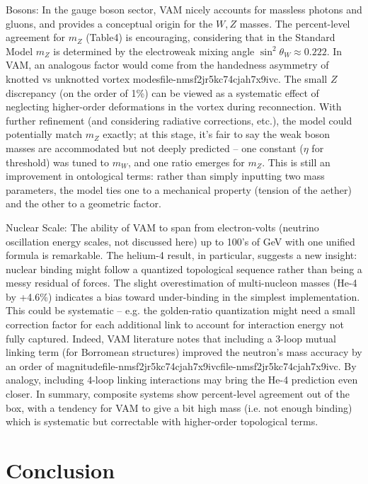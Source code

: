 Bosons: In the gauge boson sector, VAM nicely accounts for massless photons and gluons, and provides a conceptual origin for the $W,Z$ masses. The percent-level agreement for $m_Z$ (Table4) is encouraging, considering that in the Standard Model $m_Z$ is determined by the electroweak mixing angle $\sin^2\theta_W\approx0.222$. In VAM, an analogous factor would come from the handedness asymmetry of knotted vs unknotted vortex modesfile-nmsf2jr5kc74cjah7x9ivc. The small $Z$ discrepancy (on the order of 1\%) can be viewed as a systematic effect of neglecting higher-order deformations in the vortex during reconnection. With further refinement (and considering radiative corrections, etc.), the model could potentially match $m_Z$ exactly; at this stage, it’s fair to say the weak boson masses are accommodated but not deeply predicted – one constant ($\eta$ for threshold) was tuned to $m_W$, and one ratio emerges for $m_Z$. This is still an improvement in ontological terms: rather than simply inputting two mass parameters, the model ties one to a mechanical property (tension of the aether) and the other to a geometric factor.


Nuclear Scale: The ability of VAM to span from electron-volts (neutrino oscillation energy scales, not discussed here) up to 100’s of GeV with one unified formula is remarkable. The helium-4 result, in particular, suggests a new insight: nuclear binding might follow a quantized topological sequence rather than being a messy residual of forces. The slight overestimation of multi-nucleon masses (He-4 by +4.6\%) indicates a bias toward under-binding in the simplest implementation. This could be systematic – e.g. the golden-ratio quantization might need a small correction factor for each additional link to account for interaction energy not fully captured. Indeed, VAM literature notes that including a 3-loop mutual linking term (for Borromean structures) improved the neutron’s mass accuracy by an order of magnitudefile-nmsf2jr5kc74cjah7x9ivcfile-nmsf2jr5kc74cjah7x9ivc. By analogy, including 4-loop linking interactions may bring the He-4 prediction even closer. In summary, composite systems show percent-level agreement out of the box, with a tendency for VAM to give a bit high mass (i.e. not enough binding) which is systematic but correctable with higher-order topological terms.


\section*{Conclusion}


